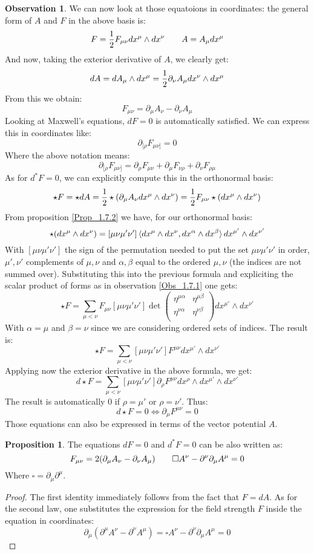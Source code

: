 \documentclass[12pt,a4paper]{report}
\theoremstyle{definition}
\theoremstyle{Theorem}
\newtheorem{Prop}[Def]{Proposition}
\theoremstyle{definition}
\theoremstyle{definition}
\newtheorem{Obs}[Def]{Observation}
\begin{document}
	\begin{Obs}
		We can now look at those equatoions in coordinates: the general form of $A$ and $F$ in the above basis is:
		$$F={1\over 2}F_{\mu\nu}dx^\mu\wedge dx^\nu\hspace{20 pt} A=A_\mu dx^\mu$$
		And now, taking the exterior derivative of $A$, we clearly get:
		$$dA=dA_\mu\wedge dx^\mu={1\over 2}\partial_\nu A_\mu dx^\nu\wedge dx^\mu$$
		From this we obtain:
		$$F_{\mu\nu}=\partial_\mu A_\nu-\partial_\nu A_\mu$$
		Looking at Maxwell's equations, $dF=0$ is automatically satisfied. We can express this in coordinates like:
		$$\partial_{[\rho} F_{\mu\nu]}=0$$
		Where the above notation means: $$\partial_{[\rho} F_{\mu\nu]}=\partial_\rho F_{\mu\nu}+\partial_\mu F_{\nu\rho}+\partial_\nu F_{\rho\mu}$$
		As for $d^*F=0$, we can explicitly compute this in the orthonormal basis:
		$$\star F=\star dA={1\over 2}\star(\partial_\mu A_\nu dx^\mu\wedge dx^\nu)={1\over 2}F_{\mu\nu}\star(dx^\mu\wedge dx^\nu)$$
		From proposition \ref{Prop_1.7.2} we have, for our orthonormal basis:
		$$\star (dx^\mu\wedge dx^\nu)= [\mu\nu\mu'\nu']\braket{dx^\mu\wedge dx^\nu,dx^\alpha\wedge dx^\beta}dx^{\mu'}\wedge dx^{\nu'}$$
		With $[\mu\nu\mu'\nu']$ the sign of the permutation needed to put the set $\mu\nu\mu'\nu'$ in order, $\mu',\nu'$ complements of $\mu,\nu$ and $\alpha,\beta$ equal to the ordered $\mu,\nu$ (the indices are not summed over). Substituting this into the previous formula and expliciting the scalar product of forms as in observation \ref{Obs_1.7.1} one gets:
		$$\star F=\sum_{\mu<\nu}F_{\mu\nu}[\mu\nu\mu'\nu']\det
		\begin{pmatrix}
			\eta^{\mu\alpha} & \eta^{\mu\beta}\\
			\eta^{\nu\alpha} & \eta^{\nu\beta}\\
		\end{pmatrix} dx^{\mu'}\wedge dx^{\nu'}$$
		With $\alpha=\mu$ and $\beta=\nu$ since we are considering ordered sets of indices. The result is:
		$$\star F=\sum_{\mu<\nu}[\mu\nu\mu'\nu']F^{\mu\nu}dx^{\mu'}\wedge dx^{\nu'}$$
		Applying now the exterior derivative in the above formula, we get:
		$$d\star F=\sum_{\mu<\nu}[\mu\nu\mu'\nu']\partial_\rho F^{\mu\nu}dx^\rho\wedge dx^{\mu'}\wedge dx^{\nu'}$$
		The result is automatically 0 if $\rho=\mu'$ or $\rho=\nu'$. Thus:
		$$d\star F=0\iff \partial_\mu F^{\mu\nu}=0$$
		Those equations can also be expressed in terms of the vector potential $A$.
	\end{Obs}
	\begin{Prop}
		The equations $dF=0$ and $d^*F=0$ can be also written as:
		$$F_{\mu\nu}=2(\partial_\mu A_\nu-\partial_\nu A_\mu)\hspace{20 pt}
		\square A^\nu-\partial^\nu\partial_\mu A^\mu=0$$
		Where $\square=\partial_\mu\partial^\mu$.
	\end{Prop}
	\begin{proof}
		The first identity immediately follows from the fact that $F=dA$. As for the second law, one substitutes the expression for the field strength $F$ inside the equation in coordinates:
		$$\partial_\mu(\partial^\mu A^\nu-\partial^\nu A^\mu)=\square A^\nu-\partial^\nu\partial_\mu A^\mu=0$$
	\end{proof}
\end{document}

